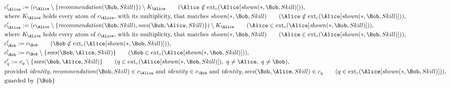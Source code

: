 \begin{align*}
&
c'_
{
\Alice
}
 := 
(c_
{
\Alice
}
 \setminus 
\{
\mathit{
recommendation
}
(
\Bob
,
Skill
)
\}
) \setminus K_
{
\Alice
}
 \qquad (
\Alice
 \notin 
\mathrm{ext}_c(
\Alice
[
\mathit{
shown
}
(
\ast
,
\Bob
,
Skill
)
]
)
)
,\\
&
\text{where } K_
{
\Alice
}
 \text{ holds every atom of } c_
{
\Alice
}
 \text{, with its multiplicity, that matches } 
\mathit{
shown
}
(
\ast
,
\Bob
,
Skill
)
 \qquad (
\Alice
 \notin 
\mathrm{ext}_c(
\Alice
[
\mathit{
shown
}
(
\ast
,
\Bob
,
Skill
)
]
)
)
,\\
&
c'_
{
\Alice
}
 := 
(c_
{
\Alice
}
 \setminus 
\{
\mathit{
recommendation
}
(
\Bob
,
Skill
)
,
\mathit{
sees
}
(
\Bob
,
\Alice
,
Skill
)
\}
) \setminus K_
{
\Alice
}
 \qquad (
\Alice
 \in 
\mathrm{ext}_c(
\Alice
[
\mathit{
shown
}
(
\ast
,
\Bob
,
Skill
)
]
)
)
,\\
&
\text{where } K_
{
\Alice
}
 \text{ holds every atom of } c_
{
\Alice
}
 \text{, with its multiplicity, that matches } 
\mathit{
shown
}
(
\ast
,
\Bob
,
Skill
)
 \qquad (
\Alice
 \in 
\mathrm{ext}_c(
\Alice
[
\mathit{
shown
}
(
\ast
,
\Bob
,
Skill
)
]
)
)
,\\
&
c'_
{
\Bob
}
 := 
c_
{
\Bob
}
 \qquad (
\Bob
 \notin 
\mathrm{ext}_c(
\Alice
[
\mathit{
shown
}
(
\ast
,
\Bob
,
Skill
)
]
)
)
,\\
&
c'_
{
\Bob
}
 := 
c_
{
\Bob
}
 \setminus 
\{
\mathit{
sees
}
(
\Bob
,
\Alice
,
Skill
)
\}
 \qquad (
\Bob
 \in 
\mathrm{ext}_c(
\Alice
[
\mathit{
shown
}
(
\ast
,
\Bob
,
Skill
)
]
)
)
,\\
&
c'_
q
 := 
c_
q
 \setminus 
\{
\mathit{
sees
}
(
\Bob
,
\Alice
,
Skill
)
\}
 \qquad (
q
 \in 
\mathrm{ext}_c(
\Alice
[
\mathit{
shown
}
(
\ast
,
\Bob
,
Skill
)
]
)
,\ 
q \neq 
\Alice
,\ 
q \neq 
\Bob
)
,\\
&
\text{provided } 
\mathit{
identity
}
,
\mathit{
recommendation
}
(
\Bob
,
Skill
)
 \in c_
{
\Alice
}
 \text{ and } 
\mathit{
identity
}
 \in c_
{
\Bob
}
 \text{ and } 
\mathit{
identity
}
,
\mathit{
sees
}
(
\Bob
,
\Alice
,
Skill
)
 \in c_
q
 \qquad (
q \in 
\mathrm{ext}_c(
\Alice
[
\mathit{
shown
}
(
\ast
,
\Bob
,
Skill
)
]
)
)
,\\
&
\text{guarded by } \{
\Bob
\}
\end{align*}
